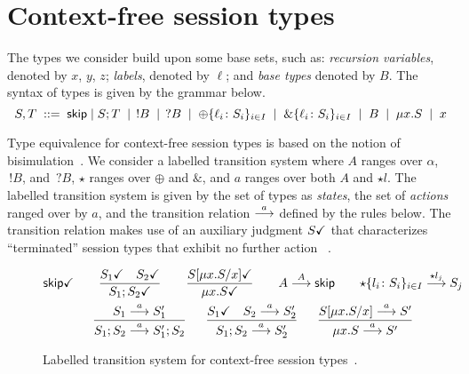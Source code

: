 \section{Context-free session types}
\label{sec:contextfreesession}

The types we consider build upon some base sets, such as:
\emph{recursion variables}, denoted by $x$, $y$, $z$;
\emph{labels}, denoted by $\ell$; and \emph{base types} denoted by
$B$.  The syntax of types is given by the grammar below.%
%
\begin{equation*}
    S,T \grmeq \skipk \mid S;T \grmor \,!B \grmor \,?B \grmor 
       \oplus\{\ell_i\colon S_i\}_{i\in I} \grmor \&\{\ell_i\colon S_i\}_{i\in I} \grmor B \grmor
       \mu x.S \grmor x
\end{equation*}

Type equivalence for context-free session types is based on the notion
of bisimulation~\cite{thiemann2016context}.%
 We consider a labelled transition system where $A$ ranges
over $\alpha$, $\,!B$, and $\,?B$, $\star$ ranges over $\oplus$ and
$\&$, and $a$ ranges over both $A$ and $\star l$.
%
The labelled transition system is given by the set of types as
\emph{states}, the set of \emph{actions} ranged over by $a$, and the
transition relation $\LTSderives$ defined by the rules below. The
transition relation makes use of an auxiliary judgment $\DONE{S}$ that
characterizes ``terminated'' session types that exhibit no further
action~\cite{DBLP:journals/jacm/AcetoH92} .
%
\begin{figure}
  \begin{gather*}
    \DONE{\skipk}
    \qquad
    \frac{\DONE{S_1} \quad \DONE{S_2}}{\DONE{S_1; S_2}}
    \qquad
    \frac{\DONE{S[\mu x.S/x]}}{\DONE{\mu x.S}}
    \qquad
    {A \LTSderives[A] \skipk }
    \qquad
    {\star\{l_i\colon S_i\}_{i\in I} \LTSderives[\star l_j] S_j}
    \\
    \frac{S_1 \LTSderives S_1'}{S_1; S_2 \LTSderives S_1';S_2}
    \quad\;\;
    \frac{\DONE{S_1} \quad S_2 \LTSderives S_2'}{S_1; S_2 \LTSderives S_2'}
    \quad\;\;
    \frac{S[\mu x.S/x] \LTSderives S'}{\mu x.S \LTSderives S'}
  \end{gather*}
\caption{Labelled transition system for context-free session types~\cite{thiemann2016context}.}
\label{lts}
\end{figure}

